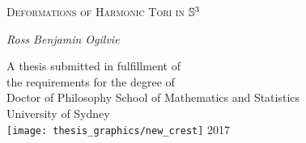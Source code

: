 
\cleardoublepage\thispagestyle{empty}
\begin{center}
{\huge{\scshape Deformations of Harmonic Tori in} $\S^3$\par}
\vspace{2cm}
{\Large\itshape Ross Benjamin Ogilvie \par}
\vfil\vfil\vfil
    A thesis submitted in fulfillment of\\
    the requirements for the degree of\\
    Doctor of Philosophy
\vfil\vfil
  {\large{School of Mathematics and Statistics}\\[5pt]
  University of Sydney}\\
  \vskip6mm
  \texttt{[image: thesis\_graphics/new\_crest]}
\vfil
  \normalsize 2017
\vfil
\end{center}
\cleardoublepage
